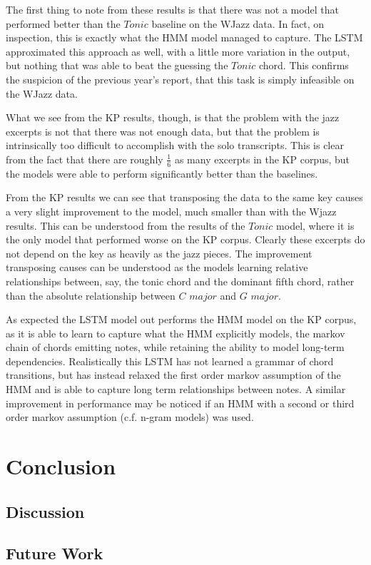 \documentclass[bsc,singlespacing,logo, parskip, deptreport]{infthesis}
\begin{document}
The first thing to note from these results is that there was not a model that performed better than the $Tonic$ baseline on the WJazz data. In fact, on inspection, this is exactly what the HMM model managed to capture. The LSTM approximated this approach as well, with a little more variation in the output, but nothing that was able to beat the guessing the $Tonic$ chord. This confirms the suspicion of the previous year's report, that this task is simply infeasible on the WJazz data.

What we see from the KP results, though, is that the problem with the jazz excerpts is not that there was not enough data, but that the problem is intrinsically too difficult to accomplish with the solo transcripts. This is clear from the fact that there are roughly $\frac{1}{6}$ as many excerpts in the KP corpus, but the models were able to perform significantly better than the baselines.

From the KP results we can see that transposing the data to the same key causes a very slight improvement to the model, much smaller than with the Wjazz results. This can be understood from the results of the $Tonic$ model, where it is the only model that performed worse on the KP corpus. Clearly these excerpts do not depend on the key as heavily as the jazz pieces. The improvement transposing causes can be understood as the models learning relative relationships between, say, the tonic chord and the dominant fifth chord, rather than the absolute relationship between $C$ $major$ and $G$ $major$.

As expected the LSTM model out performs the HMM model on the KP corpus, as it is able to learn to capture what the HMM explicitly models, the markov chain of chords emitting notes, while retaining the ability to model long-term dependencies. Realistically this LSTM has not learned a grammar of chord transitions, but has instead relaxed the first order markov assumption of the HMM and is able to capture long term relationships between notes. A similar improvement in performance may be noticed if an HMM with a second or third order markov assumption (c.f. n-gram models) was used.

\chapter{Conclusion}

\section{Discussion}

\section{Future Work}



\end{document}

